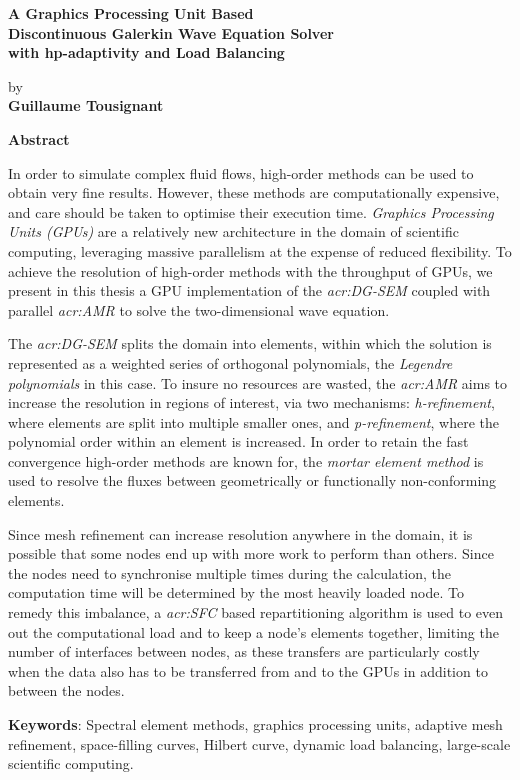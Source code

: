 \thispagestyle{plain} %

\begin{center}
	\vspace*{0.5cm} %
	{ \Large
		\textbf{A Graphics Processing Unit Based \\ 
			Discontinuous Galerkin Wave Equation Solver \\
			with hp-adaptivity and Load Balancing \\
		}
	}
	\vspace{0.4cm}
	\large

	by \\
	\vspace{0.4cm}
	\textbf{Guillaume Tousignant}
	
	\vspace{0.9cm}
	\textbf{Abstract}
	
\end{center}

In order to simulate complex fluid flows, high-order methods can be used to obtain very fine
results. However, these methods are computationally expensive, and care should be taken to optimise
their execution time. \textit{Graphics Processing Units (GPUs)} are a relatively new architecture in
the domain of scientific computing, leveraging massive parallelism at the expense of reduced
flexibility. To achieve the resolution of high-order methods with the throughput of GPUs, we present
in this thesis a GPU implementation of the \textit{\acrfull{acr:DG-SEM}} coupled with parallel
\textit{\acrfull{acr:AMR}} to solve the two-dimensional wave equation. 

The \textit{\acrlong{acr:DG-SEM}} splits the domain into elements,  within which the solution is
represented as a weighted series of orthogonal polynomials, the \textit{Legendre polynomials} in
this case. To insure no resources are wasted, the \textit{\acrlong{acr:AMR}} aims to increase the
resolution in regions of interest, via two mechanisms: \textit{h-refinement}, where elements are
split into multiple smaller ones, and \textit{p-refinement}, where the polynomial order within an
element is increased. In order to retain the fast convergence high-order methods are known for, the
\textit{mortar element method} is used to resolve the fluxes between geometrically or functionally
non-conforming elements.

Since mesh refinement can increase resolution anywhere in the domain, it is possible that some nodes
end up with more work to perform than others. Since the nodes need to synchronise multiple times
during the calculation, the computation time will be determined by the most heavily loaded node. To
remedy this imbalance, a \textit{\acrfull{acr:SFC}} based repartitioning algorithm is used to even
out the computational load and to keep a node's elements together, limiting the number of interfaces
between nodes, as these transfers are particularly costly when the data also has to be  transferred
from and to the GPUs in addition to between the nodes.


\textbf{Keywords}: Spectral element methods, graphics processing units, adaptive mesh refinement, space-filling curves, Hilbert curve, dynamic load balancing, large-scale scientific computing.

 